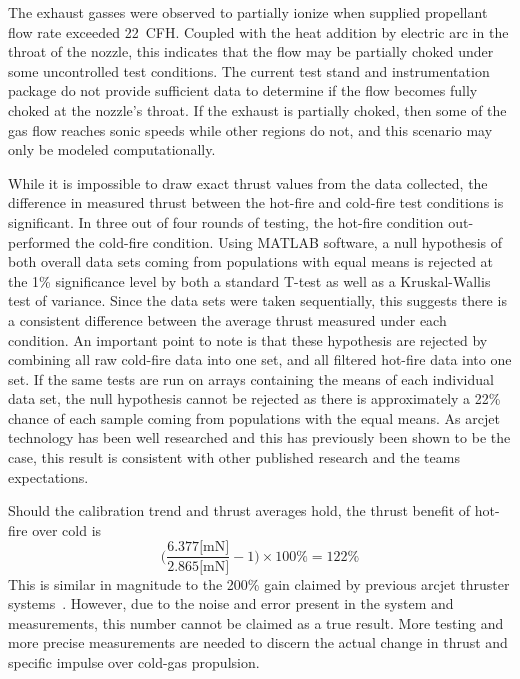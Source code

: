 \documentclass[journal]{IEEEtran}
\begin{document}
The exhaust gasses were observed to partially ionize when supplied propellant flow rate exceeded \SI{22}{CFH}.
Coupled with the heat addition by electric arc in the throat of the nozzle, this indicates that the flow may be partially choked under some uncontrolled test conditions.
The current test stand and instrumentation package do not provide sufficient data to determine if the flow becomes fully choked at the nozzle's throat.
If the exhaust is partially choked, then some of the gas flow reaches sonic speeds while other regions do not, and this scenario may only be modeled computationally.

While it is impossible to draw exact thrust values from the data collected, the difference in measured thrust between the hot-fire and cold-fire test conditions is significant.
In three out of four rounds of testing, the hot-fire condition out-performed the cold-fire condition.
Using MATLAB software, a null hypothesis of both overall data sets coming from populations with equal means is rejected at the 1\% significance level by both a standard T-test as well as a Kruskal-Wallis test of variance.
Since the data sets were taken sequentially, this suggests there is a consistent difference between the average thrust measured under each condition.
An important point to note is that these hypothesis are rejected by combining all raw cold-fire data into one set, and all filtered hot-fire data into one set.
If the same tests are run on arrays containing the means of each individual data set, the null hypothesis cannot be rejected as there is approximately a 22\% chance of each sample coming from populations with the equal means.
As arcjet technology has been well researched and this has previously been shown to be the case, this result is consistent with other published research and the teams expectations.

Should the calibration trend and thrust averages hold, the thrust benefit of hot-fire over cold is
\begin{equation}
  \Bigg(\frac{6.377 \text{[mN]}}{2.865 \text{[mN]}} - 1\Bigg)\times100\% = 122\%
  \end{equation}
This is similar in magnitude to the 200\% gain claimed by previous arcjet thruster systems~\cite{sutton2010rocket}.
However, due to the noise and error present in the system and measurements, this number cannot be claimed as a true result.
More testing and more precise measurements are needed to discern the actual change in thrust and specific impulse over cold-gas propulsion.
\end{document}
